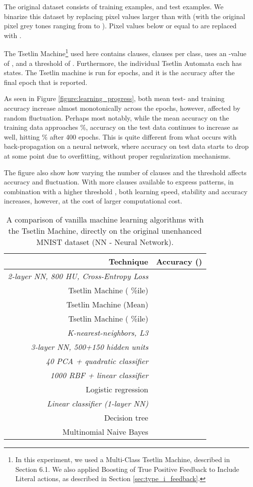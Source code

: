 \documentclass[11pt,a4paper]{article}
\begin{document}
The original dataset consists of  training examples, and  test examples. We binarize this dataset by replacing pixel values larger than  with  (with the original pixel grey tones ranging from  to ). Pixel values below or equal to  are replaced with . 

The Tsetlin Machine\footnote{In this experiment, we used a Multi-Class Tsetlin Machine, described in Section 6.1.  We also applied Boosting of True  Positive  Feedback  to  Include  Literal  actions, as described in Section \ref{sec:type_i_feedback}.} used here contains  clauses,  clauses per class, uses an -value of , and a threshold  of . Furthermore, the individual Tsetlin Automata each has  states. The Tsetlin machine is run for  epochs, and it is the accuracy after the final epoch that is reported.

As seen in Figure \ref{figure:learning_progress}, both mean test- and training accuracy increase almost monotonically across the epochs, however, affected by random fluctuation. Perhaps most notably, while the mean accuracy on the training data approaches 
\%, accuracy on the test data continues to increase as well, hitting \% after 400 epochs. This is quite different from what occurs with back-propagation on a neural network, where accuracy on test data starts to drop at some point due to overfitting, without proper regularization mechanisms.

The figure also show how varying the number of clauses and the threshold  affects accuracy and fluctuation. With more clauses available to express patterns, in combination with a higher threshold , both learning speed, stability and accuracy increases, however, at the cost of larger computational cost.

\begin{table}[!bh]
    \centering
    \begin{tabular}{r||c}
        \bf Technique&\bf Accuracy ()\\
        \hline
        {\it 2-layer NN, 800 HU, Cross-Entropy Loss}&\\
        Tsetlin Machine ( \%ile)&\\
        Tsetlin Machine (Mean)&\\
        Tsetlin Machine ( \%ile)&\\
        {\it K-nearest-neighbors, L3}&\\
        {\it 3-layer NN, 500+150 hidden units}&\\
        {\it 40 PCA + quadratic classifier}&\\
        {\it 1000 RBF + linear classifier}&\\
        Logistic regression&\\
        {\it Linear classifier (1-layer NN)}&\\
        Decision tree&\\
        Multinomial Naive Bayes&
    \end{tabular}
    \caption{A comparison of vanilla machine learning algorithms with the Tsetlin Machine, directly on the original unenhanced MNIST dataset (NN - Neural Network). }
    \label{tab:MNIST_comparison}
\end{table}
\end{document}
